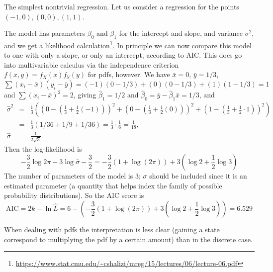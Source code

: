 	\begin{example}{The simplest nontrivial regression.}\label{favExa}
		Let us consider a regression for the points $(-1,0), (0,0), (1,1)$.


		The model has parameters $\beta_0$ and $\beta_1$ for the intercept and slope, and variance $\sigma^2$,
		and we get a likelihood calculation\footnote{\url{https://www.stat.cmu.edu/~cshalizi/mreg/15/lectures/06/lecture-06.pdf}}.
		In principle we can now compare this model to one with only a slope, or only an intercept, according to AIC.
		This does go into multivariable calculus via the independence criterion $f(x,y)=f_X(x)f_Y(y)$ for pdfs, however.
		We have $\bar x=0$, $\bar y=1/3$,
		$\sum (x_i-\bar x)(y_i-\bar y)=(-1)(0-1/3)+(0)(0-1/3)+(1)(1-1/3)=1$ and
		$\sum (x_i-\bar x)^2=2$, giving $\hat\beta_1=1/2$ and
		$\hat\beta_0=\bar y-\hat\beta_1\bar x = 1/3$, and
		\begin{eqnarray*}
			\hat\sigma^2	&=&	\frac13\left(\left(0-\left(\frac13+\frac12(-1)\right)\right)^2
							+ \left(0-\left(\frac13+\frac12(0)\right)\right)^2
							+ \left(1-\left(\frac13+\frac12\cdot 1\right)\right)^2\right)\\
							&=&	\frac13(1/36 + 1/9 + 1/36) = \frac13 \cdot \frac16 = \frac1{18},\\
			\hat\sigma		&=&	\frac1{2\sqrt{3}}.
		\end{eqnarray*}
		Then the log-likelihood is
		\[
			-\frac32\log 2\pi - 3\log \hat\sigma - \frac{3}{2} = -\frac32(1+\log(2\pi)) + 3(\log 2 + \frac12\log 3)
		\]
		The number of parameters of the model is 3; $\sigma$ should be included since it is an estimated parameter (a quantity that helps index the family of possible probability distributions). So the AIC score is
		\[
			\mathrm{AIC} = 2k - \ln \hat L = 6 - (-\frac32(1+\log(2\pi)) + 3(\log 2 + \frac12\log 3)) = 6.529
		\]
	\end{example}
		When dealing with pdfs the interpretation is less clear (gaining a state correspond to multiplying the pdf by a certain amount) than in the discrete case.
